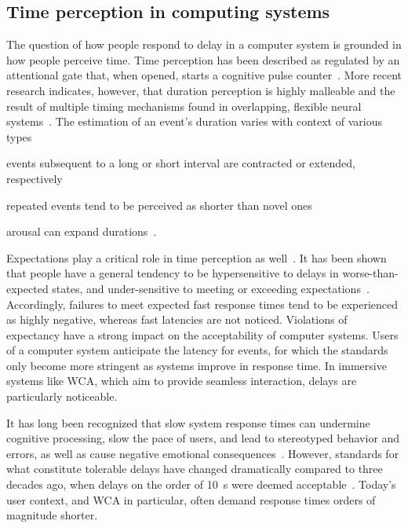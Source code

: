 \documentclass[10pt,letterpaper]{article}
\providecommand{\DIFaddbegin}{\protect\color{blue}} %
\providecommand{\DIFaddend}{\protect\color{black}} %
\newcommand{\DIFaddincludegraphics}[2][]{{\color{blue}\fbox{\DIFOincludegraphics[#1]{#2}}}} %
\DeclareRobustCommand{\DIFaddbegin}{\DIFOaddbegin \let\includegraphics\DIFaddincludegraphics} %
\DeclareRobustCommand{\DIFaddend}{\DIFOaddend \let\includegraphics\DIFOincludegraphics} %
\begin{document}
\DIFaddend \subsection{Time perception in computing systems}\DIFaddbegin \label{ssec:timeperception}
\DIFaddend 

The question of how people respond to delay in a computer system is grounded in how people perceive time.
Time perception has been described as regulated by an attentional gate that, when opened, starts a cognitive pulse counter~\autocite{zakay1995attentional,zakay1996role}.
More recent research indicates, however, that duration perception is highly malleable and the result of multiple timing mechanisms found in overlapping, flexible neural systems~\autocite{bruno2016multiple,wiener2011multiple}. 
The estimation of an event's duration varies with context of various types
\begin{enumerate*}[label={(\roman*)}, before=\unskip{: }, itemjoin={{; }}, itemjoin*={{; and }}]
    \item events subsequent to a long or short interval are contracted or extended, respectively~\autocite{heron2012duration}
    \item repeated events tend to be perceived as shorter than novel ones~\autocite{matthews2011stimulus}
    \item arousal can expand durations~\autocite{droit2011emotion}.
\end{enumerate*}

Expectations play a critical role in time perception as well~\autocite{zakay1995attentional,zakay1996role}.
It has been shown that people have a general tendency to be hypersensitive to delays in worse-than-expected states, and under-sensitive to meeting or exceeding expectations~\autocite{Loewenstein1992anomaliesintertemporalchoice}.
Accordingly, failures to meet expected fast response times tend to be experienced as highly negative, whereas fast latencies are not noticed.
Violations of expectancy have a strong impact on the acceptability of computer systems.
Users of a computer system anticipate the latency for events, for which the standards only become more stringent as systems improve in response time.
In immersive systems like WCA, which aim to provide seamless interaction, delays are particularly noticeable.

It has long been recognized that slow system response times can undermine cognitive processing, slow the pace of users, and lead to stereotyped behavior and errors, as well as cause negative emotional consequences~\autocite{dabrowsky:2011:40years}.
However, standards for what constitute tolerable delays have changed dramatically compared to three decades ago, when delays on the order of \SI{10}{\second} were deemed acceptable~\autocite{nielsen1994usability, shneiderman2016designing, seow2008designing}.
Today's user context, and WCA in particular, often demand response times orders of magnitude shorter.
\end{document}
